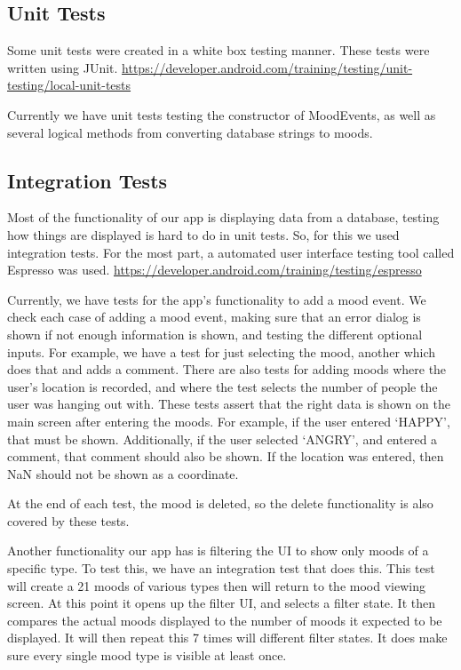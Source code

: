 \subsection{Unit Tests}
Some unit tests were created in a white box testing manner.
These tests were written using JUnit.
\url{https://developer.android.com/training/testing/unit-testing/local-unit-tests}

Currently we have unit tests testing the constructor of MoodEvents, as well as several logical methods from converting database strings to moods.



\subsection{Integration Tests}

Most of the functionality of our app is displaying data from a database,
testing how things are displayed is hard to do in unit tests. So, for this we
used integration tests. For the most part, a automated user interface testing
tool called Espresso was used.
\url{https://developer.android.com/training/testing/espresso}

Currently, we have tests for the app's functionality to add a mood event.
We check each case of adding a mood event, making sure that an error
dialog is shown if not enough information is shown, and testing the
different optional inputs. For example, we have a test for just selecting
the mood, another which does that and adds a comment. There are also tests
for adding moods where the user's location is recorded, and where the test
selects the number of people the user was hanging out with.
These tests assert that the right data is shown on the main screen
after entering the moods. For example, if the user entered `HAPPY', that
must be shown. Additionally, if the user selected `ANGRY', and entered
a comment, that comment should also be shown. If the location was entered,
then NaN should not be shown as a coordinate.

At the end of each test, the mood is deleted, so the delete functionality
is also covered by these tests.

Another functionality our app has is filtering the UI to show only moods of a
specific type. To test this, we have an integration test that does this. This
test will create a 21 moods of various types then will return to the mood
viewing screen. At this point it opens up the filter UI, and selects a filter
state. It then compares the actual moods displayed to the number of moods it
expected to be displayed. It will then repeat this 7 times will different
filter states. It does make sure every single mood type is visible at least
once.


